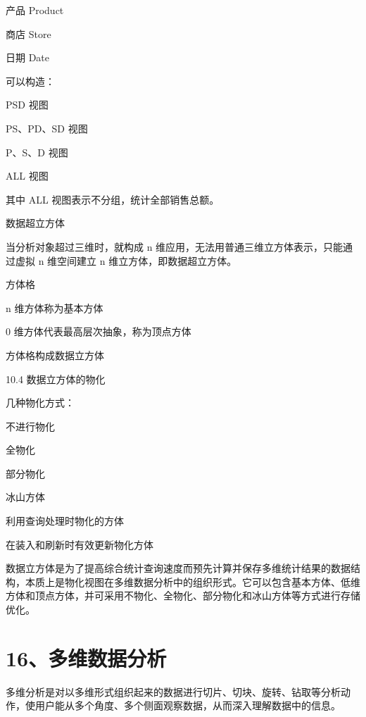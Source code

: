 \documentclass[UTF8,zihao=-4]{ctexart}
\begin{document}
产品 Product\par
商店 Store\par
日期 Date\par

可以构造：\par

PSD 视图\par
PS、PD、SD 视图\par
P、S、D 视图\par
ALL 视图\par

其中 ALL 视图表示不分组，统计全部销售总额。\par

数据超立方体\par

当分析对象超过三维时，就构成 n 维应用，无法用普通三维立方体表示，只能通过虚拟 n 维空间建立 n 维立方体，即数据超立方体。\par

方体格\par

n 维方体称为基本方体\par
0 维方体代表最高层次抽象，称为顶点方体\par
方体格构成数据立方体\par
10.4 数据立方体的物化\par

几种物化方式：\par

不进行物化\par
全物化\par
部分物化\par
冰山方体\par
利用查询处理时物化的方体\par
在装入和刷新时有效更新物化方体\par

数据立方体是为了提高综合统计查询速度而预先计算并保存多维统计结果的数据结构，本质上是物化视图在多维数据分析中的组织形式。它可以包含基本方体、低维方体和顶点方体，并可采用不物化、全物化、部分物化和冰山方体等方式进行存储优化。\par

\newpage
\section*{16、多维数据分析}

多维分析是对以多维形式组织起来的数据进行切片、切块、旋转、钻取等分析动作，使用户能从多个角度、多个侧面观察数据，从而深入理解数据中的信息。\par
\end{document}
